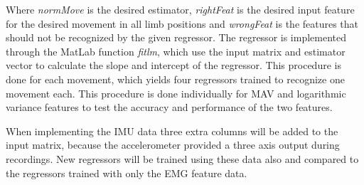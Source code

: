 Where \textit{normMove} is the desired estimator, \textit{rightFeat} is the desired input feature for the desired movement in all limb positions and \textit{wrongFeat} is the features that should not be recognized by the given regressor. The regressor is implemented through the MatLab function \textit{fitlm}, which use the input matrix and estimator vector to calculate the slope and intercept of the regressor.
This procedure is done for each movement, which yields four regressors trained to recognize one movement each. This procedure is done individually for MAV and logarithmic variance features to test the accuracy and performance of the two features. 


When implementing the IMU data three extra columns will be added to the input matrix, because the accelerometer provided a three axis output during recordings. New regressors will be trained using these data also and compared to the regressors trained with only the EMG feature data. 


